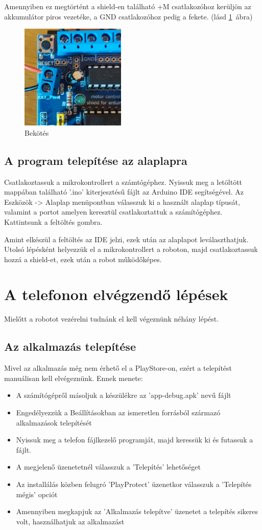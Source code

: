 \documentclass[]{thesis-ekf}
\theoremstyle{definition}
\begin{document}
Amennyiben ez megtörtént a shield-en található +M csatlakozóhoz kerüljön az akkumulátor piros vezetéke, a GND csatlakozóhoz pedig a fekete. (lásd \ref{akku}~ábra)
\begin{figure}[h]
	\centering
	\includegraphics[width=5cm]{images/robot_build/akku-connect}
	\caption{Bekötés}
	\label{akku}
\end{figure}

\subsection{A program telepítése az alaplapra}
Csatlakoztassuk a mikrokontrollert a számtógéphez. Nyissuk meg a letöltött mappában található ’.ino’ kiterjesztésű fájlt az Arduino IDE segítségével. Az Eszközök -> Alaplap menüpontban válasszuk ki a használt alaplap típusát, valamint a portot amelyen keresztül csatlakoztattuk a számítógéphez. Kattintsunk a feltöltés gombra. 

Amint elkészül a feltöltés az IDE jelzi, ezek után az alaplapot leválaszthatjuk. Utolsó lépésként helyezzük el a mikrokontrollert a roboton, majd csatlakoztassuk hozzá a shield-et, ezek után a robot működőképes.
\section{A telefonon elvégzendő lépések}
Mielőtt a robotot vezérelni tudnánk el kell végeznünk néhány lépést.
\subsection{Az alkalmazás telepítése}
Mivel az alkalmazás még nem érhető el a PlayStore-on, ezért a telepítést manuálisan kell elvégeznünk. Ennek menete:
\begin{itemize}
	\item A számítógépről másoljuk a készülékre az 'app-debug.apk' nevű fájlt
	\item Engedélyezzük a Beállításokban az ismeretlen forrásból származó alkalmazások telepítését
	\item Nyissuk meg a telefon fájlkezelő programját, majd keressük ki és futassuk a fájlt.
	\item A megjelenő üzenetetnél válasszuk a 'Telepítés' lehetőséget
	\item Az installálás közben felugró 'PlayProtect' üzenetkor válasszuk a 'Telepítés mégis' opciót
	\item Amennyiben megkapjuk az 'Alkalmazás telepítve' üzenetet a telepítés sikeres volt, használhatjuk az alkalmazást
\end{itemize}
\end{document}
